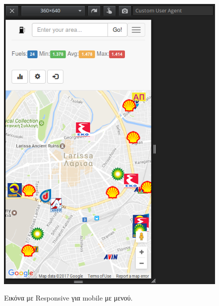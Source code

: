 \begin{figure}[H]
  \caption{Εικόνα με Responsive για mobile με μενού.}
  \centering
    \includegraphics[width=1\textwidth]{img/responsive-mobile-2.png}
    \label{fig:responsive1}
\end{figure}

